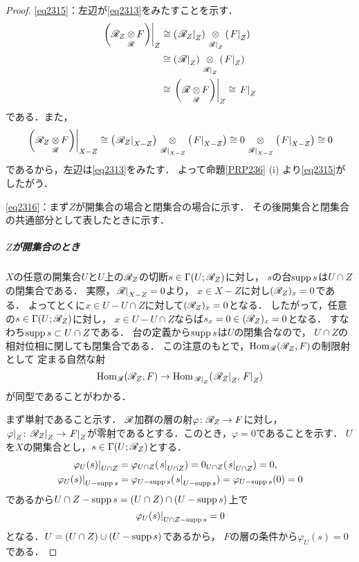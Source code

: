 \begin{proof}
    \eqref{eq2315}：左辺が\eqref{eq2313}をみたすことを示す．
    \begin{align*}
        \mres[{\left(\scR_{Z}\ttens[\scR]F\right)}]{Z}
        &\cong
        \left(\mres[\scR_{Z}]{Z}\right)\ttens[{\mres[\scR]{Z}}]\left(\mres[F]{Z}\right)\\
        &\cong
        \left(\mres[\scR]{Z}\right)\ttens[{\mres[\scR]{Z}}]\left(\mres[F]{Z}\right)\\
        &\cong
        \mres[{\left(\scR\ttens[\scR]F\right)}]{Z}
        \cong
        \mres[F]{Z}
    \end{align*}
    である．また，\[
        \mres[{\left(\scR_{Z}\ttens[\scR]F\right)}]{X-Z}
        \cong
        \left(\mres[\scR_{Z}]{X-Z}\right)\ttens[{\mres[\scR]{X-Z}}]\left(\mres[F]{X-Z}\right)
        \cong
        0\ttens[{\mres[\scR]{X-Z}}]\left(\mres[F]{X-Z}\right)
        \cong
        0
    \]
    であるから，左辺は\eqref{eq2313}をみたす．
    よって命題\ref{PRP236} (i) より\eqref{eq2315}がしたがう．

    \eqref{eq2316}：まず\(Z\)が開集合の場合と閉集合の場合に示す．
    その後開集合と閉集合の共通部分として表したときに示す．

    \subparagraph*{\(Z\)が開集合のとき}
    \(X\)の任意の開集合\(U\)と\(U\)上の\(\scR_Z\)の切断\(
        s\in \Gamma(U;\scR_Z)
    \)に対し，
    \(s\)の台\(\supp{s}\)は\(U\cap Z\)の閉集合である．
    実際，\(\mres[\scR]{X-Z}=0\)より，
    \(x\in X-Z\)に対し\((\scR_Z)_x=0\)である．
    よってとくに\(x\in U-U\cap Z\)に対して\((\scR_Z)_x=0\)となる．
    したがって，任意の\(s\in\Gamma(U;\scR_Z)\)に対し，
    \(x\in U-U\cap Z\)ならば\(s_x=0\in(\scR_Z)_x=0\)となる．
    すなわち\(\supp{s}\subset U\cap Z\)である．
    台の定義から\(\supp{s}\)は\(U\)の閉集合なので，
    \(U\cap Z\)の相対位相に関しても閉集合である．
    この注意のもとで，\(\Hom_{\scR}(\scR_Z,F)\)の制限射として
    定まる自然な射\[
        \Hom_{\scR}(\scR_Z,F)
        \to
        \Hom_{\mres[\scR]{Z}}(\mres[\scR_Z]{Z},\mres[F]{Z})
    \]が同型であることがわかる．
    
    まず単射であること示す．
    \(\scR\)加群の層の射\(\varphi\colon\scR_Z\to F\)に対し，
    \(  
        \mres[\varphi]{Z}\colon\mres[\scR_Z]{Z}\to\mres[F]{Z}
    \)が零射であるとする．このとき，\(\varphi=0\)であることを示す．
    \(U\)を\(X\)の開集合とし，\(s\in\Gamma(U;\scR_Z)\)とする．
    \begin{align*}
        \mres[\varphi_U(s)]{U\cap Z}
        &=\varphi_{U\cap Z}(\mres[s]{U\cap Z})
        =0_{U\cap Z}(\mres[s]{U\cap Z})=0,\\
        \mres[\varphi_U(s)]{U-\supp{s}}
        &=\varphi_{U-\supp{s}}(\mres[s]{U-\supp{s}})
        =\varphi_{U-\supp{s}}(0)=0
    \end{align*}
    であるから\(U\cap Z-\supp{s}=(U\cap Z)\cap(U-\supp{s})\)上で
    \[
        \mres[\varphi_U(s)]{U\cap Z-\supp{s}}=0
    \]となる．\(U=(U\cap Z)\cup(U-\supp{s})\)であるから，
    \(F\)の層の条件から\(\varphi_U(s)=0\)である．


\end{proof}
